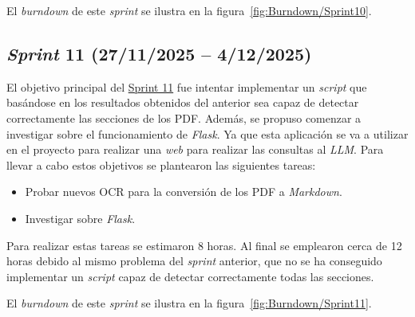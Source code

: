 El \textit{burndown} de este \textit{sprint} se ilustra en la figura~\ref{fig:Burndown/Sprint10}.

\subsection{\textit{Sprint} 11 (27/11/2025 -- 4/12/2025)}
El objetivo principal del \href{https://github.com/lbr1014/TFG_RAG/milestone/11?closed=1}{Sprint 11} fue intentar implementar un \textit{script} que basándose en los resultados obtenidos del anterior sea capaz de detectar correctamente las secciones de los PDF. Además, se propuso comenzar a investigar sobre el funcionamiento de \textit{Flask}. Ya que esta aplicación se va a utilizar en el proyecto para realizar una \textit{web} para realizar las consultas al \textit{LLM}. Para llevar a cabo estos objetivos se plantearon las siguientes tareas:
\begin{itemize}
\tightlist
	\item Probar nuevos OCR para la conversión de los PDF a \textit{Markdown}.
	\item Investigar sobre \textit{Flask}.
\end{itemize}

Para realizar estas tareas se estimaron 8 horas. Al final se emplearon cerca de 12 horas debido al mismo problema del \textit{sprint} anterior, que no se ha conseguido implementar un \textit{script} capaz de detectar correctamente todas las secciones.

El \textit{burndown} de este \textit{sprint} se ilustra en la figura~\ref{fig:Burndown/Sprint11}.

